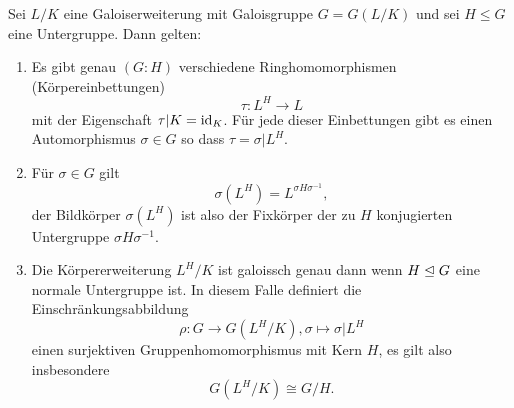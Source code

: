 \documentclass{book}
\begin{document}
\begin{thm}
    \label{thm:galoisnormal}
    Sei $L/K$ eine Galoiserweiterung mit Galoisgruppe $G=G(L/K)$ und sei $H \le
    G$ eine Untergruppe. Dann gelten:
    \begin{enumerate}
        \item Es gibt genau $(G:H)$ verschiedene Ringhomomorphismen (Körpereinbettungen) 
            \[
                \tau: L^H \to L
            \]
            mit der Eigenschaft $\tau|K = \operatorname{id}_K$. Für jede dieser Einbettungen
            gibt es einen Automorphismus $\sigma \in G$ so dass $\tau = \sigma|L^H$. 
        \item Für $\sigma \in G$ gilt
            \[
                \sigma(L^H) = L^{\sigma H \sigma^{-1}}, 
            \]
            der Bildkörper $\sigma(L^H)$ ist also der Fixkörper der zu $H$
            konjugierten Untergruppe $\sigma H \sigma^{-1}$. 
        \item Die Körpererweiterung $L^H/K$ ist galoissch genau dann wenn $H
            \trianglelefteq G$ eine normale Untergruppe ist. In diesem Falle definiert die
            Einschränkungsabbildung
            \[
                \rho: G \to G(L^H/K), \sigma \mapsto \sigma|L^H
            \]
            einen surjektiven Gruppenhomomorphismus mit Kern $H$, es gilt also insbesondere
            \[
                G(L^H/K) \cong G/H.
            \]
    \end{enumerate}
\end{thm}
\end{document}
